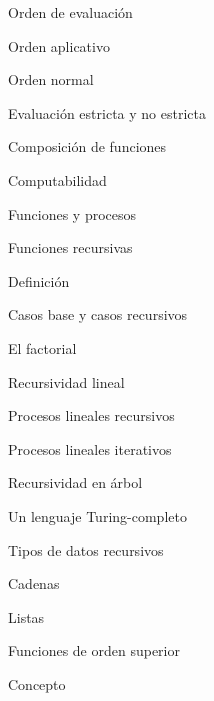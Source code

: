 \begin{longenum}
\begin{longenum}
\begin{longenum}
            \begin{longenum}
                \item Orden de evaluación
                \begin{longenum}
                    \item Orden aplicativo
                    \item Orden normal
                \end{longenum}
                \item Evaluación estricta y no estricta
            \end{longenum}
            \item Composición de funciones
        \end{longenum}
        \item Computabilidad
        \begin{longenum}
            \item Funciones y procesos
            \item Funciones recursivas
            \begin{longenum}
                \item Definición
                \item Casos base y casos recursivos
                \item El factorial
                \item Recursividad lineal
                \begin{longenum}
                    \item Procesos lineales recursivos
                    \item Procesos lineales iterativos
                \end{longenum}
                \item Recursividad en árbol
            \end{longenum}
            \item Un lenguaje Turing-completo
        \end{longenum}
        \item Tipos de datos recursivos
        \begin{longenum}
            \item Cadenas
            \item Listas
        \end{longenum}
        \item Funciones de orden superior
        \begin{longenum}
            \item Concepto

\end{longenum}
\end{longenum}
\end{longenum}
